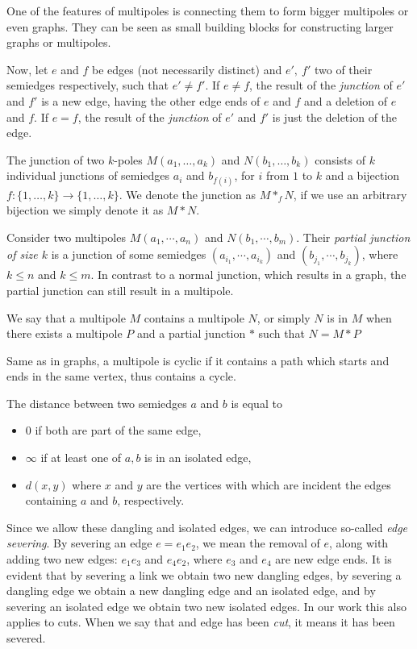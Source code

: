 \documentclass[12pt, twoside]{book}
\begin{document}
One of the features of multipoles is connecting them to form bigger multipoles or even graphs. They can be seen as small building blocks for constructing larger graphs or multipoles. 

Now, let $e$ and $f$ be edges (not necessarily distinct) and $e',~f'$ two of their semiedges respectively, such that $e'\neq f'$. If $e\neq f$, the result of the \textit{junction} of $e'$ and $f'$ is a new edge, having the other edge ends of $e$ and $f$ and a deletion of $e$ and $f$. If $e=f$, the result of the \textit{junction} of $e'$ and $f'$ is just the deletion of the edge.

The junction of two $k$-poles $M(a_1,\dots,a_k)$ and $N(b_1,\dots,b_k)$ consists of $k$ individual junctions of semiedges $a_i$ and $b_{f(i)}$, for $i$ from $1$ to $k$ and a bijection $f:\{1,\dots,k\}\rightarrow\{1,\dots,k\}$. We denote the junction as $M*_fN$, if we use an arbitrary bijection we simply denote it as $M*N$.

Consider two multipoles $M(a_1,\cdots,a_n)$ and $N(b_1,\cdots,b_m)$. Their \textit{partial junction of size $k$} is a junction of some semiedges $(a_{i_1},\cdots, a_{i_k})$ and $(b_{j_1},\cdots, b_{j_k})$, where $k\leq n$ and $k\leq m$. In contrast to a normal junction, which results in a graph, the partial junction can still result in a multipole.

We say that a multipole $M$ contains a multipole $N$, or simply $N$ is in $M$ when there exists a multipole $P$ and a partial junction $*$ such that $N=M*P$

Same as in graphs, a multipole is cyclic if it contains a path which starts and ends in the same vertex, thus contains a cycle.

The distance between two semiedges $a$ and $b$ is equal to
\begin{itemize}
	\item 0 if both are part of the same edge,
	\item $\infty$ if at least one of $a,b$ is in an isolated edge,
	\item $d(x,y)$ where $x$ and $y$ are the vertices with which are incident the edges containing $a$ and $b$, respectively.
\end{itemize}

Since we allow these dangling and isolated edges, we can introduce so-called \textit{edge severing}. By severing an edge $e=e_1e_2$, we mean the removal of $e$, along with adding two new edges: $e_1e_3$ and $e_4e_2$, where $e_3$ and $e_4$ are new edge ends. It is evident that by severing a link we obtain two new dangling edges, by severing a dangling edge we obtain a new dangling edge and an isolated edge, and by severing an isolated edge we obtain two new isolated edges. In our work this also applies to cuts. When we say that and edge has been \textit{cut}, it means it has been severed.
\end{document}
